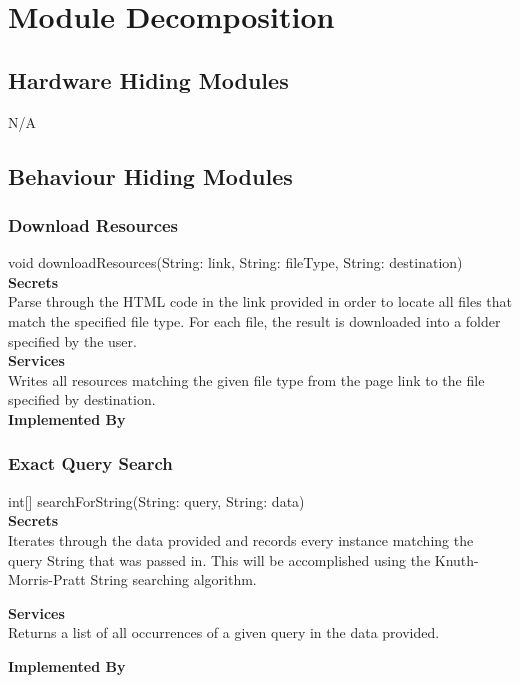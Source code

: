 \documentclass[titlepage]{article}
\begin{document}
\section{Module Decomposition}
\subsection{Hardware Hiding Modules}
N/A
\subsection{Behaviour Hiding Modules}
\subsubsection{Download Resources}
void downloadResources(String: link, String: fileType, String: destination)\\

\textbf{Secrets}\\

Parse through the HTML code in the link provided in order to locate all files that match the specified file type. For each file, the result is downloaded into a folder specified by the user.\\

\textbf{Services}\\

Writes all resources matching the given file type from the page link to the file specified by destination.\\

\textbf{Implemented By}\\

\subsubsection{Exact Query Search}
int[] searchForString(String: query, String: data)\\

\textbf{Secrets}\\

Iterates through the data provided and records every instance matching the query String that was passed in. This will be accomplished using the Knuth-Morris-Pratt String searching algorithm.

\textbf{Services}\\

Returns a list of all occurrences of a given query in the data provided.

\textbf{Implemented By}\\
\end{document}
